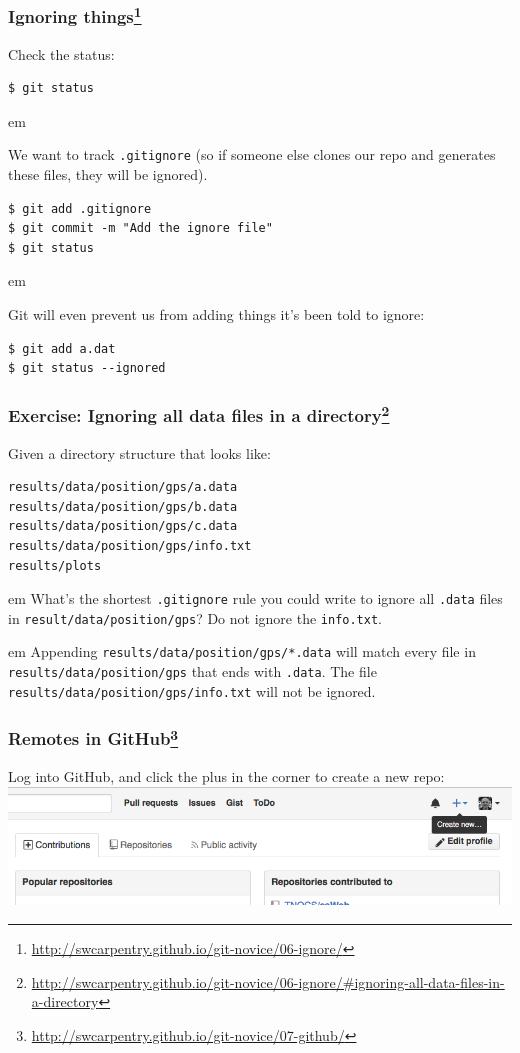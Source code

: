\documentclass{beamer}
\begin{document}
\begin{frame}[fragile]
\frametitle{Ignoring things\footnote{\url{http://swcarpentry.github.io/git-novice/06-ignore/}}}

Check the status:
\begin{verbatim}
$ git status
\end{verbatim}
\pause
{} em

We want to track \texttt{.gitignore} (so if someone else clones our repo and generates these files, they will be ignored).
\begin{verbatim}
$ git add .gitignore
$ git commit -m "Add the ignore file"
$ git status
\end{verbatim}
\pause
{} em

Git will even prevent us from adding things it's been told to ignore:
\begin{verbatim}
$ git add a.dat
$ git status --ignored
\end{verbatim}

\end{frame}

\begin{frame}[fragile]
\frametitle{Exercise: Ignoring all data files in a directory\footnote{\url{http://swcarpentry.github.io/git-novice/06-ignore/\#ignoring-all-data-files-in-a-directory}}}
Given a directory structure that looks like:
\begin{verbatim}
results/data/position/gps/a.data
results/data/position/gps/b.data
results/data/position/gps/c.data
results/data/position/gps/info.txt
results/plots
\end{verbatim}
 em
What's the shortest \texttt{.gitignore} rule you could write to ignore all \texttt{.data} files in \texttt{result/data/position/gps}? Do not ignore the \texttt{info.txt}.


\pause
{} em
\textcolor{green!50!black}{
Appending \texttt{results/data/position/gps/*.data} will match every file in \texttt{results/data/position/gps} that ends with \texttt{.data}. The file \texttt{results/data/position/gps/info.txt} will not be ignored.
}

\end{frame}

\begin{frame}
\frametitle{Remotes in GitHub\footnote{\url{http://swcarpentry.github.io/git-novice/07-github/}}}

Log into GitHub, and click the plus in the corner to create a new repo:\\
\includegraphics[width=\textwidth]{github-create-repo-01.png}

\end{frame}
\end{document}
